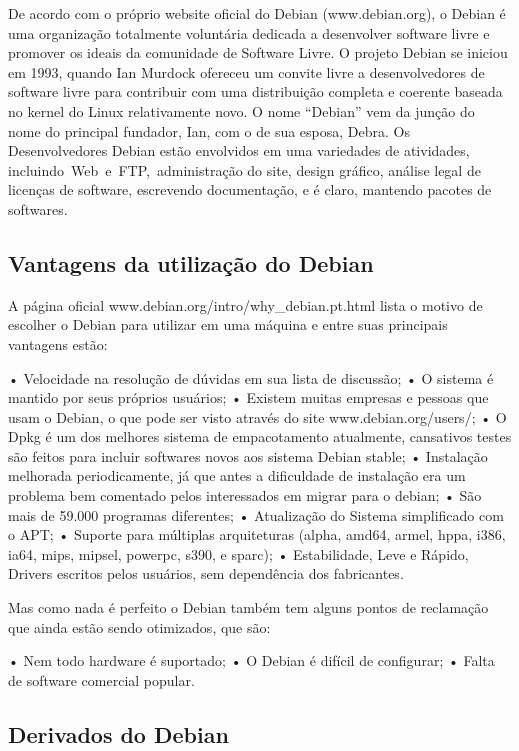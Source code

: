 De acordo com o próprio website oficial do Debian (www.debian.org), o Debian é uma organização totalmente voluntária dedicada a desenvolver software livre e promover os ideais da comunidade de Software Livre. O projeto Debian se iniciou em 1993, quando Ian Murdock ofereceu um convite livre a desenvolvedores de software livre para contribuir com uma distribuição completa e coerente baseada no kernel do Linux relativamente novo. O nome “Debian” vem da junção do nome do principal fundador, Ian, com o de sua esposa, Debra. Os Desenvolvedores Debian estão envolvidos em uma variedades de atividades, incluindo Web e FTP, administração do site, design gráfico, análise legal de licenças de software, escrevendo documentação, e é claro, mantendo pacotes de softwares.

\subsection{Vantagens da utilização do Debian}
A página oficial www.debian.org/intro/why\_debian.pt.html lista o motivo de escolher o Debian para utilizar em uma máquina e entre suas principais vantagens estão:

• Velocidade na resolução de dúvidas em sua lista de discussão;
• O sistema é mantido por seus próprios usuários;
• Existem muitas empresas e pessoas que usam o Debian, o que pode ser visto através do site www.debian.org/users/;
• O Dpkg é um dos melhores sistema de empacotamento atualmente, cansativos testes são feitos para incluir softwares novos aos sistema Debian stable;
• Instalação melhorada periodicamente, já que antes a dificuldade de instalação era um problema bem comentado pelos interessados em migrar para o debian;
• São mais de 59.000 programas diferentes;
• Atualização do Sistema simplificado com o APT;
• Suporte para múltiplas arquiteturas (alpha, amd64, armel, hppa, i386, ia64, mips, mipsel, powerpc, s390, e sparc);
• Estabilidade, Leve e Rápido, Drivers escritos pelos usuários, sem dependência dos fabricantes.

Mas como nada é perfeito o Debian também tem alguns pontos de reclamação que ainda estão sendo otimizados, que são:

• Nem todo hardware é suportado;
• O Debian é difícil de configurar;
• Falta de software comercial popular.

\subsection{Derivados do Debian}

